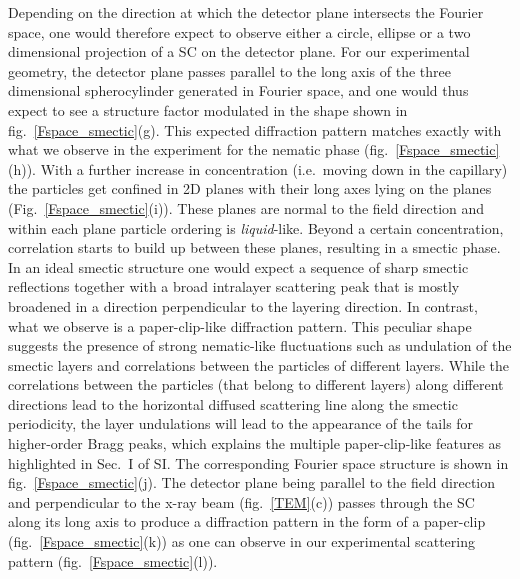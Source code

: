 \documentclass[aps,prl,preprint,superscriptaddress,showkeys]{revtex4-2} %
\begin{document}
Depending on the direction at which the detector plane intersects the Fourier space, one would therefore expect to observe either a circle, ellipse or a two dimensional projection of a SC on the detector plane. For our experimental geometry, the detector plane passes parallel to the long axis of the three dimensional spherocylinder generated in Fourier space, and one would thus expect to see a structure factor modulated in the shape shown in fig.~\ref{Fspace_smectic}(g). This expected diffraction pattern matches exactly with what we observe in the experiment for the nematic phase (fig.~\ref{Fspace_smectic}(h)). With a further increase in concentration (i.e.~moving down in the capillary) the particles get confined in 2D planes with their long axes lying on the planes (Fig.~\ref{Fspace_smectic}(i)). These planes are normal to the field direction and within each plane particle ordering is \emph{liquid}-like. Beyond a certain concentration, correlation starts to build up between these planes, resulting in a smectic phase. In an ideal smectic structure one would expect a sequence of sharp smectic reflections together with a broad intralayer scattering peak that is mostly broadened in a direction perpendicular to the layering direction. In contrast, what we observe is a paper-clip-like diffraction pattern. This peculiar shape suggests the presence of strong nematic-like fluctuations such as undulation of the smectic layers and correlations between the particles of different layers. While the correlations between the particles (that belong to different layers) along different directions lead to the horizontal diffused scattering line along the smectic periodicity, the layer undulations will lead to the appearance of the tails for higher-order Bragg peaks, which explains the multiple paper-clip-like features as highlighted in Sec.~I of SI. The corresponding Fourier space structure is shown in fig.~\ref{Fspace_smectic}(j). The detector plane being parallel to the field direction and perpendicular to the x-ray beam (fig.~\ref{TEM}(c)) passes through the SC along its long axis to produce a diffraction pattern in the form of a paper-clip (fig.~\ref{Fspace_smectic}(k)) as one can observe in our experimental scattering pattern (fig.~\ref{Fspace_smectic}(l)).\par
\end{document}
